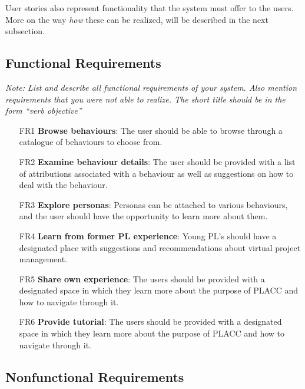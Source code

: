 User stories also represent functionality that the system must offer to the users. More on the way \textit{how} these can be realized, will be described in the next subsection.

\subsection{Functional Requirements}

\textit{Note: List and describe all functional requirements of your system. Also mention requirements that you were not able to realize. The short title should be in the form ``verb objective''}

\begin{itemize}
\item [FR1] \textbf{Browse behaviours}: The user should be able to browse through a catalogue of behaviours to choose from.
\item [FR2] \textbf{Examine behaviour details}: The user should be provided with a list of attributions associated with a behaviour as well as suggestions on how to deal with the behaviour.
\item [FR3] \textbf{Explore personas}: Personas can be attached to various behaviours, and the user should have the opportunity to learn more about them. 
\item [FR4] \textbf{Learn from former PL experience}: Young PL's should have a designated place with suggestions and recommendations about virtual project management.
\item [FR5] \textbf{Share own experience}: The users should be provided with a designated space in which they learn more about the purpose of PLACC and how to navigate through it.
\item [FR6] \textbf{Provide tutorial}: The users should be provided with a designated space in which they learn more about the purpose of PLACC and how to navigate through it.
\end{itemize}

\subsection{Nonfunctional Requirements}


